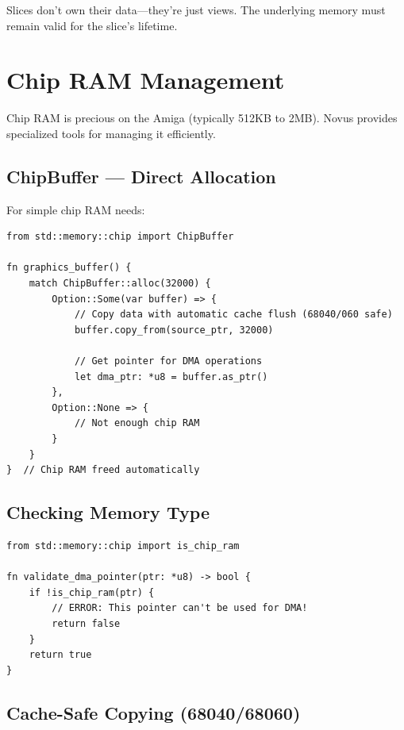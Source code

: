 \begin{tipbox}
Slices don't own their data---they're just views. The underlying memory must remain valid for the slice's lifetime.
\end{tipbox}

\section{Chip RAM Management}
\label{sec:chip-ram}

Chip RAM is precious on the Amiga (typically 512KB to 2MB). Novus provides specialized tools for managing it efficiently.

\subsection{ChipBuffer --- Direct Allocation}

For simple chip RAM needs:

\begin{lstlisting}
from std::memory::chip import ChipBuffer

fn graphics_buffer() {
    match ChipBuffer::alloc(32000) {
        Option::Some(var buffer) => {
            // Copy data with automatic cache flush (68040/060 safe)
            buffer.copy_from(source_ptr, 32000)

            // Get pointer for DMA operations
            let dma_ptr: *u8 = buffer.as_ptr()
        },
        Option::None => {
            // Not enough chip RAM
        }
    }
}  // Chip RAM freed automatically
\end{lstlisting}

\subsection{Checking Memory Type}

\begin{lstlisting}
from std::memory::chip import is_chip_ram

fn validate_dma_pointer(ptr: *u8) -> bool {
    if !is_chip_ram(ptr) {
        // ERROR: This pointer can't be used for DMA!
        return false
    }
    return true
}
\end{lstlisting}

\subsection{Cache-Safe Copying (68040/68060)}

